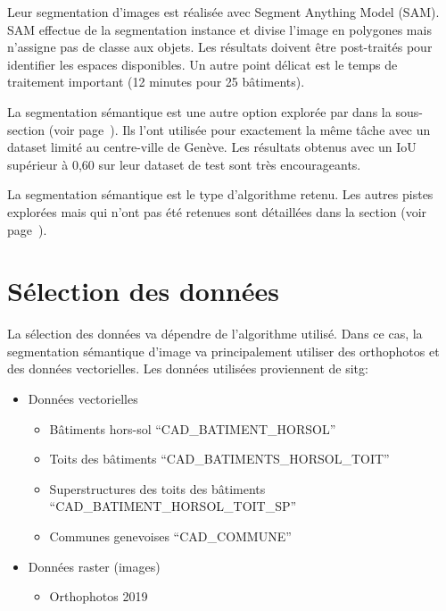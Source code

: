 Leur segmentation d'images est réalisée avec Segment Anything Model (SAM). SAM effectue de la segmentation instance et divise l'image en polygones mais n'assigne pas de classe aux objets. Les résultats doivent être post-traités pour identifier les espaces disponibles. Un autre point délicat est le temps de traitement important (12 minutes pour 25 bâtiments).

La segmentation sémantique est une autre option explorée par \citeauthor{castello_quantification_2021} dans la sous-section \textit{} (voir page~\pageref{subsec:castello_quantification_2021}). Ils l'ont utilisée pour exactement la même tâche avec un dataset limité au centre-ville de Genève. Les résultats obtenus avec un IoU supérieur à 0,60 sur leur dataset de test sont très encourageants.

La segmentation sémantique est le type d'algorithme retenu. Les autres pistes explorées mais qui n'ont pas été retenues sont détaillées dans la section \textit{} (voir page~\pageref{sec:pistes_explorees}).

\section{Sélection des données}
La sélection des données va dépendre de l'algorithme utilisé. Dans ce cas, la segmentation sémantique d'image va principalement utiliser des orthophotos et des données vectorielles. Les données utilisées proviennent de \acrshort{sitg}:
\begin{itemize}
    \item Données vectorielles
    \begin{itemize}
        \item Bâtiments hors-sol ``CAD\_BATIMENT\_HORSOL'' \cite{sitg_batiments_nodate}
        \item Toits des bâtiments ``CAD\_BATIMENTS\_HORSOL\_TOIT'' \cite{sitg_toits_nodate}
        \item Superstructures des toits des bâtiments ``CAD\_BATIMENT\_HORSOL\_TOIT\_SP'' \cite{sitg_superstructures_nodate}
        \item Communes genevoises ``CAD\_COMMUNE'' \cite{sitg_communes_nodate}
    \end{itemize}
    \item Données raster (images)
    \begin{itemize}
        \item Orthophotos 2019 \cite{sitg_orthophotos_nodate}
    \end{itemize}
\end{itemize}

